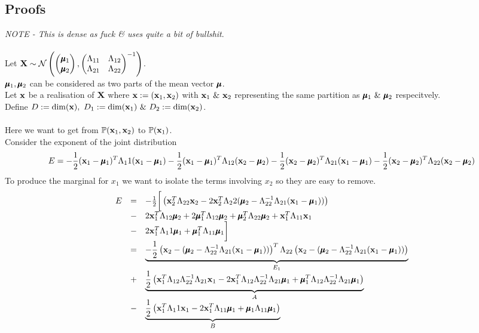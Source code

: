 \documentclass[11pt,a4paper]{article}
\begin{document}
\subsection{Proofs}
\textit{NOTE - This is dense as fuck \& uses quite a bit of bullshit}.\\
\\Let $\textbf{X}\sim\mathcal{N}\left(\begin{pmatrix}
\pmb{\mu}_1\\\pmb{\mu}_2
\end{pmatrix},\begin{pmatrix}
\Lambda_{11}&\Lambda_{12}\\
\Lambda_{21}&\Lambda_{22}
\end{pmatrix}^{-1}\right)$.\\
$\pmb{\mu}_1,\pmb{\mu}_2$ can be considered as two parts of the mean vector $\pmb{\mu}$.\\
Let $\textbf{x}$ be a realisation of $\textbf{X}$ where $\textbf{x}:=(\textbf{x}_1,\textbf{x}_2)$ with $\textbf{x}_1\ \&\ \textbf{x}_2$ representing the same partition as $\pmb{\mu}_1\ \&\ \pmb{\mu}_2$ respecitvely.\\
Define $D:=\mathrm{dim}(\x),\ D_1:=\mathrm{dim}(\x_1)\ \&\ D_2:=\mathrm{dim}(\x_2)$.\\
\\Here we want to get from $\mathbb{P}(\textbf{x}_1,\textbf{x}_2)$ to $\mathbb{P}(\textbf{x}_1)$.\\
Consider the exponent of the joint distribution
$$E=-\frac{1}{2}(\textbf{x}_1-\pmb{\mu}_1)^T\Lambda_11(\textbf{x}_1-\pmb{\mu}_1)-\frac{1}{2}(\textbf{x}_1-\pmb{\mu}_1)^T\Lambda_{12}(\textbf{x}_2-\pmb{\mu}_2)-\frac{1}{2}(\textbf{x}_2-\pmb{\mu}_2)^T\Lambda_{21}(\textbf{x}_1-\pmb{\mu}_1)-\frac{1}{2}(\textbf{x}_2-\pmb{\mu}_2)^T\Lambda_{22}(\textbf{x}_2-\pmb{\mu}_2)$$
To produce the marginal for $x_1$ we want to isolate the terms involving $x_2$ so they are easy to remove.
\[\begin{array}{rcl}
E&=&-\frac{1}{2}\bigg[\left(\textbf{x}_2^T\Lambda_{22}\textbf{x}_2-2\textbf{x}_2^T\Lambda_22(\pmb{\mu}_2-\Lambda_{22}^{-1}\Lambda_{21}(\textbf{x}_1-\pmb{\mu}_1))\right)\\
&-&2\textbf{x}_1^T\Lambda_{12}\pmb{\mu}_2+2\pmb{\mu}_1^T\Lambda_{12}\pmb{\mu}_2+\pmb{\mu}_2^T\Lambda_{22}\pmb{\mu}_2+\textbf{x}_1^T\Lambda_{11}\textbf{x}_1\\
&-&2\textbf{x}_1^T\Lambda_11\pmb{\mu}_1+\pmb{\mu}_1^T\Lambda_{11}\pmb{\mu}_1\bigg]\\
&=&\underbrace{-\frac{1}{2}\left(\textbf{x}_2-(\pmb{\mu}_2-\Lambda_{22}^{-1}\Lambda_{21}(\textbf{x}_1-\pmb{\mu}_1))\right)^T\Lambda_{22}\left(\textbf{x}_2-(\pmb{\mu}_2-\Lambda_{22}^{-1}\Lambda_{21}(\textbf{x}_1-\pmb{\mu}_1))\right)}_{E_1}\\
&+&\underbrace{\frac{1}{2}\left(\textbf{x}_1^T\Lambda_{12}\Lambda_{22}^{-1}\Lambda_{21}\textbf{x}_1-2\textbf{x}_1^T\Lambda_{12}\Lambda_{22}^{-1}\Lambda_{21}\pmb{\mu}_1+\pmb{\mu}_1^T\Lambda_{12}\Lambda_{22}^{-1}\Lambda_{21}\pmb{\mu}_1\right)}_{A}\\
&-&\underbrace{\frac{1}{2}\left(\textbf{x}_1^T\Lambda_11\textbf{x}_1-2\textbf{x}_1^T\Lambda_{11}\pmb{\mu}_1+\pmb{\mu}_{1}\Lambda_{11}\pmb{\mu}_1\right)}_{B}
\end{array}\]
\end{document}
